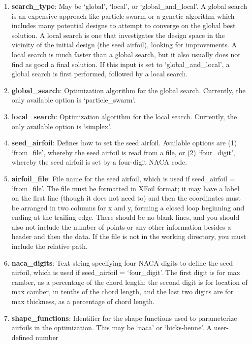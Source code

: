 \documentclass[11pt]{article}
\begin{document}
\begin{enumerate}
\item{\textbf{search\_type}: May be `global', `local', or `global\_and\_local'.
A global search is an expensive approach like particle swarm or a genetic algorithm which
includes many potential designs to attempt to converge on the global best solution.  A
local search is one that investigates the design space in the vicinity of the initial
design (the seed airfoil), looking for improvements.  A local search is much faster than
a global search, but it also usually does not find as good a final solution.  If this
input is set to `global\_and\_local', a global search is first performed, followed by a
local search.}
\item{\textbf{global\_search}: Optimization algorithm for the global search.  Currently,
the only available option is `particle\_swarm'.}
\item{\textbf{local\_search}: Optimization algorithm for the local search.  Currently, the
only available option is `simplex'.}
\item{\textbf{seed\_airfoil}: Defines how to set the seed airfoil.  Available options are
(1) `from\_file', whereby the seed airfoil is read from a file, or (2) `four\_digit',
whereby the seed airfoil is set by a four-digit NACA code.}
\item{\textbf{airfoil\_file}: File name for the seed airfoil, which is used if
seed\_airfoil = `from\_file'.  The file must be formatted in XFoil format; it may have a
label on the first line (though it does not need to) and then the coordinates must be
arranged in two columns for x and y, forming a closed loop beginning and ending at the
trailing edge. There should be no blank lines, and you should also not include the number
of points or any other information besides a header and then the data.  If the file is not 
in the working directory, you must include the relative path.}
\item{\textbf{naca\_digits}: Text string specifying four NACA digits to define the seed
airfoil, which is used if seed\_airfoil = `four\_digit'.  The first digit is for max camber,
as a percentage of the chord length; the second digit is for location of max camber, in
tenths of the chord length, and the last two digits are for max thickness, as a percentage
of chord length.}
\item{\textbf{shape\_functions}: Identifier for the shape functions used to parameterize
airfoils in the optimization.  This may be `naca' or `hicks-henne'.  A user-defined number
}
\end{enumerate}
\end{document}
